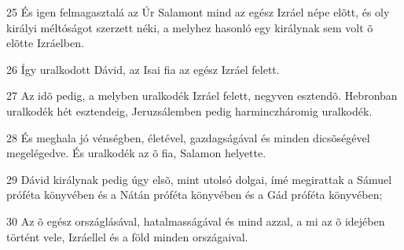 \par 25 És igen felmagasztalá az Úr Salamont mind az egész Izráel népe elõtt, és oly királyi méltóságot szerzett néki, a melyhez hasonló egy királynak sem volt õ elõtte Izráelben.
\par 26 Így uralkodott Dávid, az Isai fia az egész Izráel felett.
\par 27 Az idõ pedig, a melyben uralkodék Izráel felett, negyven esztendõ. Hebronban uralkodék hét esztendeig, Jeruzsálemben pedig harminczháromig uralkodék.
\par 28 És meghala jó vénségben, életével, gazdagságával és minden dicsõségével megelégedve. És uralkodék az õ  fia, Salamon helyette.
\par 29 Dávid királynak pedig úgy elsõ, mint utolsó dolgai, ímé megirattak a Sámuel próféta könyvében és a Nátán próféta könyvében és a Gád próféta könyvében;
\par 30 Az õ egész országlásával, hatalmasságával és mind azzal, a mi az õ idejében történt vele, Izráellel és a föld minden országaival.



